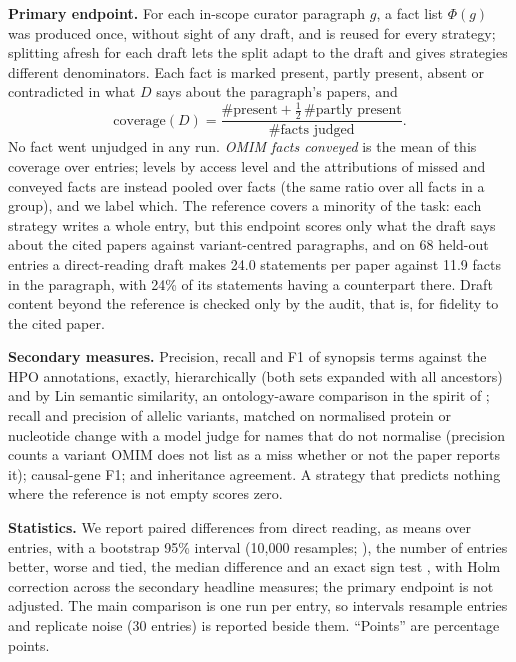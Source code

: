 \documentclass{article} %
\begin{document}
\textbf{Primary endpoint.} For each in-scope curator paragraph $g$, a fact list $\Phi(g)$ was produced once, without sight of any draft, and is reused for every strategy; splitting afresh for each draft lets the split adapt to the draft and gives strategies different denominators. Each fact is marked present, partly present, absent or contradicted in what $D$ says about the paragraph's papers, and
\begin{equation}
\text{coverage}(D)=\frac{\#\text{present}+\tfrac12\,\#\text{partly present}}{\#\text{facts judged}} .
\end{equation}
No fact went unjudged in any run. \emph{OMIM facts conveyed} is the mean of this coverage over entries; levels by access level and the attributions of missed and conveyed facts are instead pooled over facts (the same ratio over all facts in a group), and we label which. The reference covers a minority of the task: each strategy writes a whole entry, but this endpoint scores only what the draft says about the cited papers against variant-centred paragraphs, and on 68 held-out entries a direct-reading draft makes 24.0 statements per paper against 11.9 facts in the paragraph, with 24\% of its statements having a counterpart there. Draft content beyond the reference is checked only by the audit, that is, for fidelity to the cited paper.

\textbf{Secondary measures.} Precision, recall and F1 of synopsis terms against the HPO annotations, exactly, hierarchically (both sets expanded with all ancestors) and by Lin semantic similarity, an ontology-aware comparison in the spirit of \citet{Khler2009ClinicalDiagnostics}; recall and precision of allelic variants, matched on normalised protein or nucleotide change with a model judge for names that do not normalise (precision counts a variant OMIM does not list as a miss whether or not the paper reports it); causal-gene F1; and inheritance agreement. A strategy that predicts nothing where the reference is not empty scores zero.

\textbf{Statistics.} We report paired differences from direct reading, as means over entries, with a bootstrap 95\% interval (10,000 resamples; \citealp{Efron1979BootstrapMethods}), the number of entries better, worse and tied, the median difference and an exact sign test \citep{Dixon1946StatisticalSign}, with Holm correction \citep{holm1979simple} across the secondary headline measures; the primary endpoint is not adjusted. The main comparison is one run per entry, so intervals resample entries and replicate noise (30 entries) is reported beside them. ``Points'' are percentage points.
\end{document}
